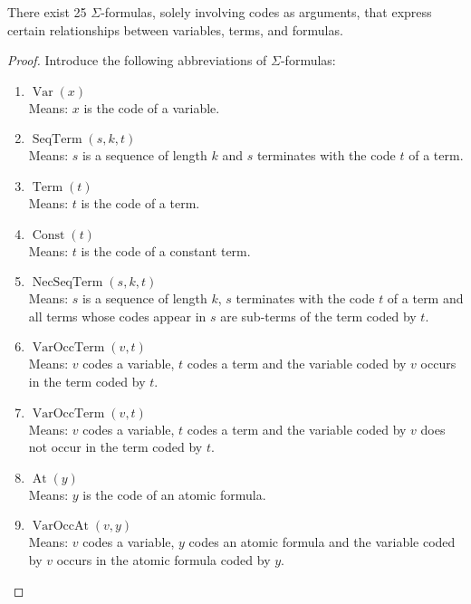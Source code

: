 \begin{lemma}
    \label{lem:IsSigma.Relations}
    There exist 25 $\Sigma$-formulas, solely involving codes as arguments, that express certain
    relationships between variables, terms, and formulas.
\end{lemma}

\begin{proof}
    Introduce the following abbreviations of $\Sigma$-formulas:
    \begin{enumerate}
        \item $\operatorname{Var}(x)$\\
        Means: $x$ is the code of a variable.
        \item $\operatorname{SeqTerm}(s,k,t)$\\
        Means: $s$ is a sequence of length $k$ and $s$ terminates with the code $t$ of a term.
        \item $\operatorname{Term}(t)$\\
        Means: $t$ is the code of a term.
        \item $\operatorname{Const}(t)$\\
        Means: $t$ is the code of a constant term.
        \item $\operatorname{NecSeqTerm}(s,k,t)$\\
        Means: $s$ is a sequence of length $k$, $s$ terminates with the code $t$ of a term and
        all terms whose codes appear in $s$ are sub-terms of the term coded by $t$.
        \item $\operatorname{VarOccTerm}(v,t)$\\
        Means: $v$ codes a variable, $t$ codes a term and 
        the variable coded by $v$ occurs in the term coded by $t$.
        \item $\operatorname{VarOccTerm}(v,t)$\\
        Means: $v$ codes a variable, $t$ codes a term and 
        the variable coded by $v$ does not occur in the term coded by $t$.
        \item $\operatorname{At}(y)$\\
        Means: $y$ is the code of an atomic formula.
        \item $\operatorname{VarOccAt}(v,y)$\\
        Means: $v$ codes a variable, $y$ codes an atomic formula and 
        the variable coded by $v$ occurs in the atomic formula coded by $y$.

\end{enumerate}
\end{proof}

